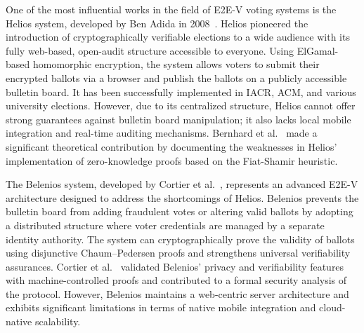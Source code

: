 \documentclass[a4paper,fleqn]{cas-sc}
\begin{document}
One of the most influential works in the field of E2E-V voting systems is the Helios system, developed by Ben Adida in 2008~\cite{Adida2008}. Helios pioneered the introduction of cryptographically verifiable elections to a wide audience with its fully web-based, open-audit structure accessible to everyone. Using ElGamal-based homomorphic encryption, the system allows voters to submit their encrypted ballots via a browser and publish the ballots on a publicly accessible bulletin board. It has been successfully implemented in IACR, ACM, and various university elections. However, due to its centralized structure, Helios cannot offer strong guarantees against bulletin board manipulation; it also lacks local mobile integration and real-time auditing mechanisms. Bernhard et al.~\cite{Bernhard2012} made a significant theoretical contribution by documenting the weaknesses in Helios' implementation of zero-knowledge proofs based on the Fiat-Shamir heuristic.


The Belenios system, developed by Cortier et al.~\cite{Cortier2019}, represents an advanced E2E-V architecture designed to address the shortcomings of Helios. Belenios prevents the bulletin board from adding fraudulent votes or altering valid ballots by adopting a distributed structure where voter credentials are managed by a separate identity authority. The system can cryptographically prove the validity of ballots using disjunctive Chaum--Pedersen proofs and strengthens universal verifiability assurances. Cortier et al.~\cite{Cortier2018} validated Belenios' privacy and verifiability features with machine-controlled proofs and contributed to a formal security analysis of the protocol. However, Belenios maintains a web-centric server architecture and exhibits significant limitations in terms of native mobile integration and cloud-native scalability.
\end{document}

